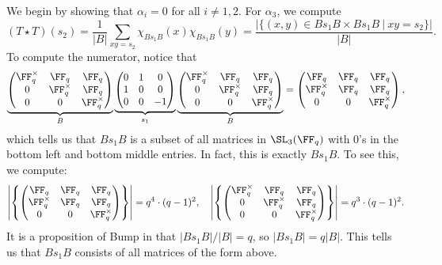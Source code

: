 \documentclass[11pt]{amsart}
\theoremstyle{remark}
\begin{document}
We begin by showing that $\alpha_i=0$ for all $i\neq1,2$.
For $\alpha_3$, we compute
\[
	(T\star T)(s_2) = \frac{1}{|B|}\sum_{xy=s_2} \chi_{Bs_1B}(x)\chi_{Bs_1B}(y) = \frac{|\{(x,y)\in Bs_1B\times Bs_1B\ |\ xy=s_2\}|}{|B|}.
\]
To compute the numerator, notice that
\[
	\underbrace{\begin{pmatrix}
			\FF_q^\times & \FF_q        & \FF_q        \\
			0            & \FF_q^\times & \FF_q        \\
			0            & 0            & \FF_q^\times
		\end{pmatrix}}_{B}
	\underbrace{\begin{pmatrix}
			0 & 1 & 0 \\ 1 & 0 & 0 \\ 0 & 0 & -1
		\end{pmatrix}}_{s_1}
	\underbrace{\begin{pmatrix}
			\FF_q^\times & \FF_q        & \FF_q        \\
			0            & \FF_q^\times & \FF_q        \\
			0            & 0            & \FF_q^\times
		\end{pmatrix}}_{B} =
	\begin{pmatrix}
		\FF_q        & \FF_q & \FF_q        \\
		\FF_q^\times & \FF_q & \FF_q        \\
		0            & 0     & \FF_q^\times
	\end{pmatrix},
\]
which tells us that $Bs_1B$ is a subset of all matrices in $\SL_3(\FF_q)$ with $0$'s in the bottom left and bottom middle entries.
In fact, this is exactly $Bs_1B$.
To see this, we compute:
\[
	\left|\left\{\begin{pmatrix}
		\FF_q        & \FF_q & \FF_q        \\
		\FF_q^\times & \FF_q & \FF_q        \\
		0            & 0     & \FF_q^\times
	\end{pmatrix}\right\}\right| = q^4\cdot (q-1)^2,\quad \left|\left\{\begin{pmatrix}
		\FF_q^\times & \FF_q        & \FF_q        \\
		0            & \FF_q^\times & \FF_q        \\
		0            & 0            & \FF_q^\times
	\end{pmatrix}\right\}\right| = q^3\cdot (q-1)^2.
\]
It is a proposition of Bump in \cite{Bump10} that $|Bs_1B|/|B|=q$, so $|Bs_1B|=q|B|$.
This tells us that $Bs_1B$ consists of all matrices of the form above.
\end{document}

